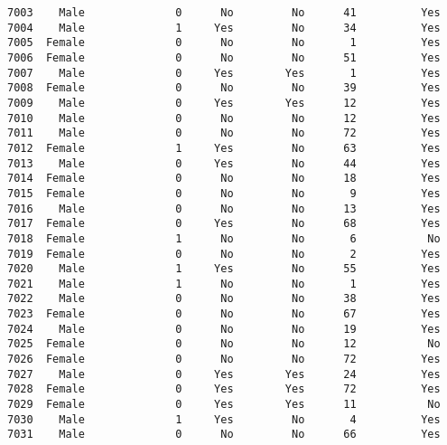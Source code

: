 \documentclass[11pt]{article}
\begin{document}
\begin{tcolorbox}[breakable, boxrule=.5pt, size=fbox, pad at break*=1mm, opacityfill=0]
\begin{Verbatim}[commandchars=\\\{\}]
7003    Male              0      No         No      41          Yes
7004    Male              1     Yes         No      34          Yes
7005  Female              0      No         No       1          Yes
7006  Female              0      No         No      51          Yes
7007    Male              0     Yes        Yes       1          Yes
7008  Female              0      No         No      39          Yes
7009    Male              0     Yes        Yes      12          Yes
7010    Male              0      No         No      12          Yes
7011    Male              0      No         No      72          Yes
7012  Female              1     Yes         No      63          Yes
7013    Male              0     Yes         No      44          Yes
7014  Female              0      No         No      18          Yes
7015  Female              0      No         No       9          Yes
7016    Male              0      No         No      13          Yes
7017  Female              0     Yes         No      68          Yes
7018  Female              1      No         No       6           No
7019  Female              0      No         No       2          Yes
7020    Male              1     Yes         No      55          Yes
7021    Male              1      No         No       1          Yes
7022    Male              0      No         No      38          Yes
7023  Female              0      No         No      67          Yes
7024    Male              0      No         No      19          Yes
7025  Female              0      No         No      12           No
7026  Female              0      No         No      72          Yes
7027    Male              0     Yes        Yes      24          Yes
7028  Female              0     Yes        Yes      72          Yes
7029  Female              0     Yes        Yes      11           No
7030    Male              1     Yes         No       4          Yes
7031    Male              0      No         No      66          Yes


\end{Verbatim}
\end{tcolorbox}
\end{document}

